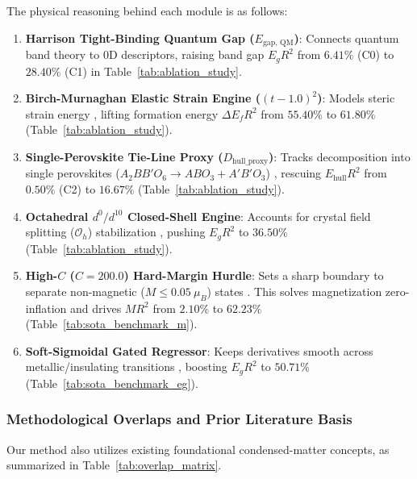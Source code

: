 \documentclass[journal=jcisd8,manuscript=article]{achemso}
\begin{document}
The physical reasoning behind each module is as follows:
\begin{enumerate}
\item \textbf{Harrison Tight-Binding Quantum Gap ($E_{\text{gap, QM}}$)}: Connects quantum band theory \cite{harrison1999elementary, zaanen1985band} to 0D descriptors, raising band gap $E_g R^2$ from $6.41\%$ (C0) to \textbf{$28.40\%$} (C1) in Table~\ref{tab:ablation_study}.
\item \textbf{Birch-Murnaghan Elastic Strain Engine ($(t - 1.0)^2$)}: Models steric strain energy \cite{goldschmidt1926gesetze, woodward1997octahedral}, lifting formation energy $\Delta E_f R^2$ from $55.40\%$ to \textbf{$61.80\%$} (Table~\ref{tab:ablation_study}).
\item \textbf{Single-Perovskite Tie-Line Proxy ($D_{\text{hull\_proxy}}$)}: Tracks decomposition into single perovskites ($A_2BB'O_6 \rightarrow ABO_3 + A'B'O_3$) \cite{sun2016thermodynamic, yamashita2018band}, rescuing $E_{\text{hull}} R^2$ from $0.50\%$ (C2) to \textbf{$16.67\%$} (Table~\ref{tab:ablation_study}).
\item \textbf{Octahedral $d^0/d^{10}$ Closed-Shell Engine}: Accounts for crystal field splitting ($\mathcal{O}_h$) stabilization \cite{goodenough1971magnetism, walsh2011design}, pushing $E_g R^2$ to \textbf{$36.50\%$} (Table~\ref{tab:ablation_study}).
\item \textbf{High-$C$ ($C=200.0$) Hard-Margin Hurdle}: Sets a sharp boundary to separate non-magnetic ($M \le 0.05\ \mu_B$) states \cite{goodenough1955theory, kanamori1959superexchange}. This solves magnetization zero-inflation and drives $M R^2$ from $2.10\%$ to \textbf{$62.23\%$} (Table~\ref{tab:sota_benchmark_m}).
\item \textbf{Soft-Sigmoidal Gated Regressor}: Keeps derivatives smooth across metallic/insulating transitions \cite{borlido2019large}, boosting $E_g R^2$ to \textbf{$50.71\%$} (Table~\ref{tab:sota_benchmark_eg}).
\end{enumerate}

\subsubsection{Methodological Overlaps and Prior Literature Basis}
Our method also utilizes existing foundational condensed-matter concepts, as summarized in Table~\ref{tab:overlap_matrix}.
\end{document}
